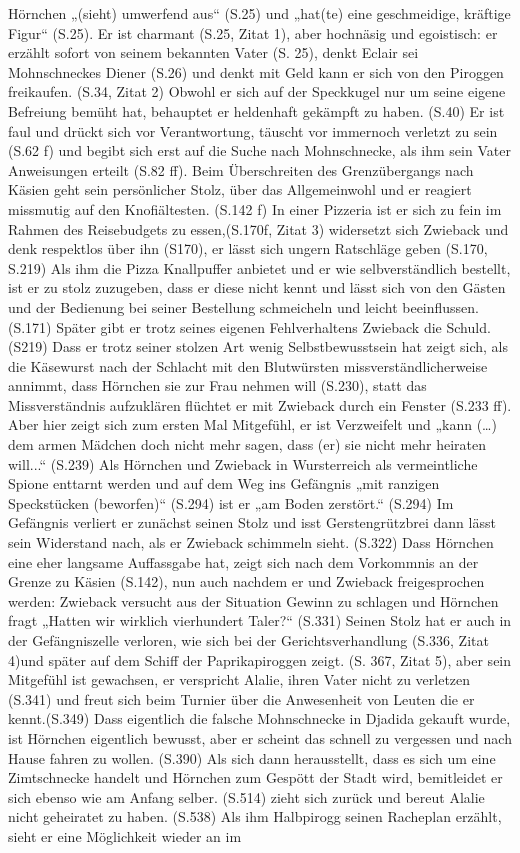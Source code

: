 Hörnchen „(sieht) umwerfend aus“ (S.25) und „hat(te) eine geschmeidige, kräftige Figur“ (S.25). Er ist charmant (S.25, Zitat 1), aber hochnäsig und egoistisch: er erzählt sofort von seinem bekannten Vater (S. 25), denkt Eclair sei Mohnschneckes Diener (S.26) und denkt mit Geld kann er sich von den Piroggen freikaufen. (S.34, Zitat 2) Obwohl er sich auf der Speckkugel nur um seine eigene Befreiung bemüht hat, behauptet er heldenhaft gekämpft zu haben. (S.40)  Er ist faul und drückt sich vor Verantwortung, täuscht vor immernoch verletzt zu sein (S.62 f) und begibt sich erst auf die Suche nach Mohnschnecke, als ihm sein Vater Anweisungen erteilt (S.82 ff). Beim Überschreiten des Grenzübergangs nach Käsien geht sein persönlicher Stolz, über das Allgemeinwohl und er reagiert missmutig auf den Knofiältesten. (S.142 f)
In einer Pizzeria ist er sich zu fein im Rahmen des Reisebudgets zu essen,(S.170f, Zitat 3) widersetzt sich Zwieback und denk respektlos über ihn (S170), er lässt sich ungern Ratschläge geben (S.170, S.219) Als ihm die Pizza Knallpuffer anbietet und er wie selbverständlich bestellt, ist er zu stolz zuzugeben, dass er diese nicht kennt und lässt sich von den Gästen und der Bedienung bei seiner Bestellung schmeicheln und leicht beeinflussen. (S.171) Später gibt er trotz seines eigenen Fehlverhaltens Zwieback die Schuld. (S219) Dass er trotz seiner stolzen Art wenig Selbstbewusstsein hat zeigt sich, als die Käsewurst nach der Schlacht mit den Blutwürsten missverständlicherweise annimmt, dass Hörnchen sie zur Frau nehmen will (S.230), statt das Missverständnis aufzuklären flüchtet er mit Zwieback durch ein Fenster (S.233 ff). Aber hier zeigt sich zum ersten Mal Mitgefühl, er ist Verzweifelt und „kann (…) dem armen Mädchen doch nicht mehr sagen, dass (er) sie nicht mehr heiraten will...“ (S.239) Als Hörnchen und Zwieback in Wursterreich als vermeintliche Spione enttarnt werden und auf dem Weg ins Gefängnis „mit ranzigen Speckstücken (beworfen)“ (S.294) ist er „am Boden zerstört.“ (S.294) Im Gefängnis verliert er zunächst seinen Stolz und isst Gerstengrützbrei  dann lässt sein Widerstand nach, als er Zwieback schimmeln sieht. (S.322) Dass Hörnchen eine eher langsame Auffassgabe hat, zeigt sich nach dem Vorkommnis an der Grenze zu Käsien (S.142), nun auch nachdem er und Zwieback freigesprochen werden: Zwieback versucht aus der Situation Gewinn zu schlagen und Hörnchen fragt „Hatten wir wirklich vierhundert Taler?“ (S.331) Seinen Stolz hat er auch in der Gefängniszelle verloren, wie sich bei der Gerichtsverhandlung (S.336, Zitat 4)und später auf dem Schiff der Paprikapiroggen zeigt. (S. 367, Zitat 5), aber sein Mitgefühl ist gewachsen, er verspricht Alalie, ihren Vater nicht zu verletzen (S.341) und freut sich beim Turnier über die Anwesenheit von Leuten die er kennt.(S.349) Dass eigentlich die falsche Mohnschnecke in Djadida gekauft wurde, ist Hörnchen eigentlich bewusst, aber er scheint das schnell zu vergessen und nach Hause fahren zu wollen. (S.390) Als sich dann herausstellt, dass es sich um eine Zimtschnecke handelt und Hörnchen zum Gespött der Stadt wird, bemitleidet er sich ebenso wie am Anfang selber. (S.514) zieht sich zurück und bereut Alalie nicht geheiratet zu haben. (S.538) Als ihm Halbpirogg seinen Racheplan erzählt, sieht er eine Möglichkeit wieder an im 